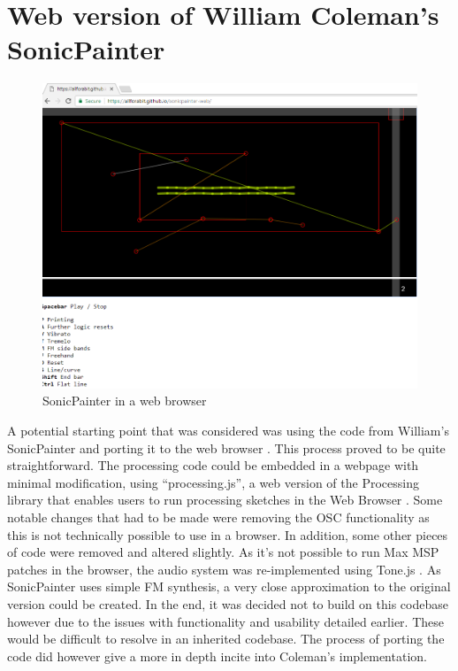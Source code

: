 \documentclass[12pt]{report}
\begin{document}
\section{Web version of William Coleman's SonicPainter}
\label{sec:orgc437744}
\begin{LATEX}
\begin{figure}[h]
\centering
\includegraphics[width=1.0\textwidth]{./assets/sonicpainter-web.png}
\caption{SonicPainter in a web browser}
\label{fig:sonicpainter-web}
\end{figure}
\label{org7d979bf}
\end{LATEX}
A potential starting point that was considered was using the code from William's
SonicPainter and porting it to the web browser
\cite{coleman_sonicpainter:_2015}. This process proved to be quite
straightforward. The processing code could be embedded in a webpage with minimal
modification, using ``processing.js'', a web version of the Processing library
that enables users to run processing sketches in the Web Browser
\cite{fry_processing.js_2017}. Some notable changes that had to be made were
removing the OSC functionality as this is not technically possible to use in a
browser. In addition, some other pieces of code were removed and altered
slightly. As it's not possible to run Max MSP patches in the browser, the audio
system was re-implemented using Tone.js \cite{mann_interactive_2015}. As
SonicPainter uses simple FM synthesis, a very close approximation to the
original version could be created. In the end, it was decided not to build on
this codebase however due to the issues with functionality and usability
detailed earlier. These would be difficult to resolve in an inherited codebase.
The process of porting the code did however give a more in depth incite into
Coleman's implementation. 
\end{document}
